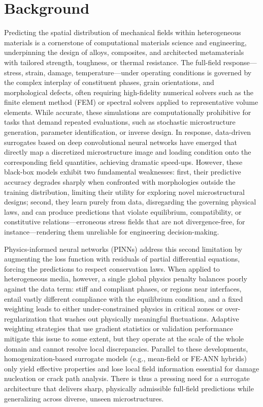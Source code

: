\documentclass{article}
\begin{document}
\section{Background}
Predicting the spatial distribution of mechanical fields within heterogeneous materials is a cornerstone of computational materials science and engineering, underpinning the design of alloys, composites, and architected metamaterials with tailored strength, toughness, or thermal resistance. The full-field response—stress, strain, damage, temperature—under operating conditions is governed by the complex interplay of constituent phases, grain orientations, and morphological defects, often requiring high-fidelity numerical solvers such as the finite element method (FEM) or spectral solvers applied to representative volume elements. While accurate, these simulations are computationally prohibitive for tasks that demand repeated evaluations, such as stochastic microstructure generation, parameter identification, or inverse design. In response, data-driven surrogates based on deep convolutional neural networks have emerged that directly map a discretized microstructure image and loading condition onto the corresponding field quantities, achieving dramatic speed-ups. However, these black-box models exhibit two fundamental weaknesses: first, their predictive accuracy degrades sharply when confronted with morphologies outside the training distribution, limiting their utility for exploring novel microstructural designs; second, they learn purely from data, disregarding the governing physical laws, and can produce predictions that violate equilibrium, compatibility, or constitutive relations—erroneous stress fields that are not divergence-free, for instance—rendering them unreliable for engineering decision-making.

Physics-informed neural networks (PINNs) address this second limitation by augmenting the loss function with residuals of partial differential equations, forcing the predictions to respect conservation laws. When applied to heterogeneous media, however, a single global physics penalty balances poorly against the data term: stiff and compliant phases, or regions near interfaces, entail vastly different compliance with the equilibrium condition, and a fixed weighting leads to either under-constrained physics in critical zones or over-regularization that washes out physically meaningful fluctuations. Adaptive weighting strategies that use gradient statistics or validation performance mitigate this issue to some extent, but they operate at the scale of the whole domain and cannot resolve local discrepancies. Parallel to these developments, homogenization-based surrogate models (e.g., mean-field or FE-ANN hybrids) only yield effective properties and lose local field information essential for damage nucleation or crack path analysis. There is thus a pressing need for a surrogate architecture that delivers sharp, physically admissible full-field predictions while generalizing across diverse, unseen microstructures.
\end{document}
